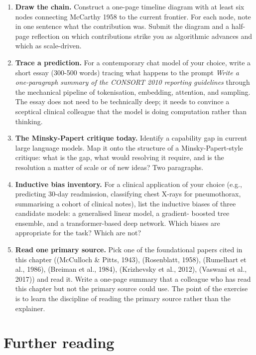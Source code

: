 \documentclass[
  letterpaper,
  11pt]{scrbook}
\begin{document}
\begin{enumerate}
\def\labelenumi{\arabic{enumi}.}
\item
  \textbf{Draw the chain.} Construct a one-page timeline diagram with at
  least six nodes connecting McCarthy 1958 to the current frontier. For
  each node, note in one sentence what the contribution was. Submit the
  diagram and a half-page reflection on which contributions strike you
  as algorithmic advances and which as scale-driven.
\item
  \textbf{Trace a prediction.} For a contemporary chat model of your
  choice, write a short essay (300-500 words) tracing what happens to
  the prompt \emph{Write a one-paragraph summary of the CONSORT 2010
  reporting guidelines} through the mechanical pipeline of tokenisation,
  embedding, attention, and sampling. The essay does not need to be
  technically deep; it needs to convince a sceptical clinical colleague
  that the model is doing computation rather than thinking.
\item
  \textbf{The Minsky-Papert critique today.} Identify a capability gap
  in current large language models. Map it onto the structure of a
  Minsky-Papert-style critique: what is the gap, what would resolving it
  require, and is the resolution a matter of scale or of new ideas? Two
  paragraphs.
\item
  \textbf{Inductive bias inventory.} For a clinical application of your
  choice (e.g., predicting 30-day readmission, classifying chest X-rays
  for pneumothorax, summarising a cohort of clinical notes), list the
  inductive biases of three candidate models: a generalised linear
  model, a gradient- boosted tree ensemble, and a transformer-based deep
  network. Which biases are appropriate for the task? Which are not?
\item
  \textbf{Read one primary source.} Pick one of the foundational papers
  cited in this chapter ((McCulloch \& Pitts, 1943), (Rosenblatt, 1958),
  (Rumelhart et al., 1986), (Breiman et al., 1984), (Krizhevsky et al.,
  2012), (Vaswani et al., 2017)) and read it. Write a one-page summary
  that a colleague who has read this chapter but not the primary source
  could use. The point of the exercise is to learn the discipline of
  reading the primary source rather than the explainer.
\end{enumerate}

\section{Further reading}\label{further-reading}
\end{document}
